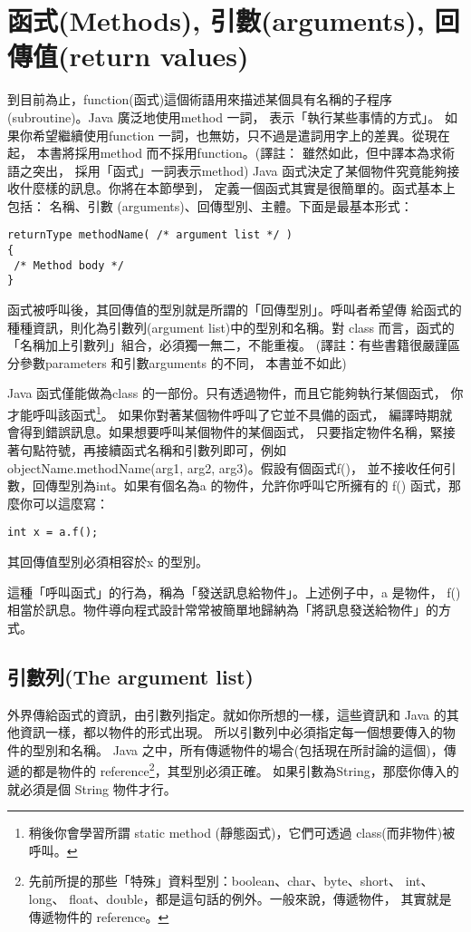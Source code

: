 \section{函式(Methods), 引數(arguments), 回傳值(return values)}
到目前為止，function(函式)這個術語用來描述某個具有名稱的子程序
(subroutine)。Java 廣泛地使用method 一詞，
表示「執行某些事情的方式」。
如果你希望繼續使用function 一詞，也無妨，只不過是遣詞用字上的差異。從現在起，
本書將採用method 而不採用function。(譯註： 雖然如此，但中譯本為求術語之突出，
採用「函式」一詞表示method)
Java 函式決定了某個物件究竟能夠接收什麼樣的訊息。你將在本節學到，
定義一個函式其實是很簡單的。函式基本上包括： 名稱、引數
(arguments)、回傳型別、主體。下面是最基本形式：

\begin{Verbatim}[frame=single]
returnType methodName( /* argument list */ ) 
{
 /* Method body */
}
\end{Verbatim}

函式被呼叫後，其回傳值的型別就是所謂的「回傳型別」。呼叫者希望傳
給函式的種種資訊，則化為引數列(argument list)中的型別和名稱。對
class 而言，函式的「名稱加上引數列」組合，必須獨一無二，不能重複。
(譯註：有些書籍很嚴謹區分參數parameters 和引數arguments 的不同，
本書並不如此)

Java 函式僅能做為class 的一部份。只有透過物件，而且它能夠執行某個函式，
你才能呼叫該函式\footnote{稍後你會學習所謂 static method (靜態函式)，它們可透過
class(而非物件)被呼叫。}。 如果你對著某個物件呼叫了它並不具備的函式，
編譯時期就會得到錯誤訊息。如果想要呼叫某個物件的某個函式，
只要指定物件名稱，緊接著句點符號，再接續函式名稱和引數列即可，例如
objectName.methodName(arg1, arg2, arg3)。假設有個函式f()，
並不接收任何引數，回傳型別為int。如果有個名為a 的物件，允許你呼叫它所擁有的
f() 函式，那麼你可以這麼寫：

\begin{Verbatim}[frame=single]
int x = a.f();
\end{Verbatim}

其回傳值型別必須相容於x 的型別。

這種「呼叫函式」的行為，稱為「發送訊息給物件」。上述例子中，a 是物件，
f() 相當於訊息。物件導向程式設計常常被簡單地歸納為「將訊息發送給物件」的方式。

\subsection{引數列(The argument list)}
外界傳給函式的資訊，由引數列指定。就如你所想的一樣，這些資訊和
Java 的其他資訊一樣，都以物件的形式出現。
所以引數列中必須指定每一個想要傳入的物件的型別和名稱。
Java 之中，所有傳遞物件的場合(包括現在所討論的這個)，傳遞的都是物件的
reference\footnote{先前所提的那些「特殊」資料型別：boolean、char、byte、short、
int、long、 float、double，都是這句話的例外。一般來說，傳遞物件，
其實就是傳遞物件的 reference。}，其型別必須正確。
如果引數為String，那麼你傳入的就必須是個 String 物件才行。

